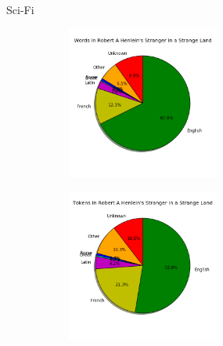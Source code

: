 \documentclass[10pt]{beamer}
\begin{document}
\begin{frame}[fragile]{Sci-Fi}

  \begin{figure}
  \centering
  \begin{subfigure}
  \centering
    \includegraphics[width=5cm]{scifiwords.png}
  \end{subfigure}
  \begin{subfigure}
  \centering
    \includegraphics[width=5cm]{scifitokens.png}
  \end{subfigure}
  \end{figure}

\end{frame}
\end{document}
